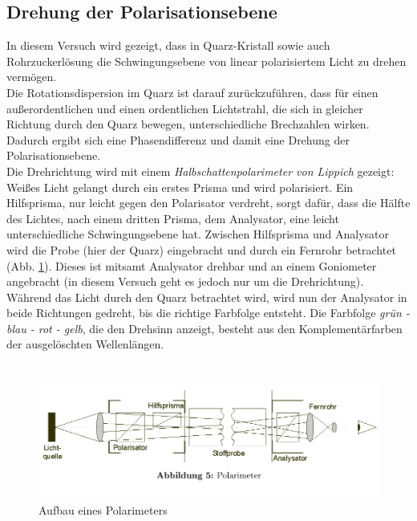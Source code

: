 \documentclass[12pt,a4paper]{article}
\begin{document}
\begin{multicols}{2}
\subsection{Drehung der Polarisationsebene}

In diesem Versuch wird gezeigt, dass in Quarz-Kristall sowie auch Rohrzuckerlösung die Schwingungsebene von linear polarisiertem Licht zu drehen vermögen.\\
Die Rotationsdispersion im Quarz ist darauf zurückzuführen, dass für einen außerordentlichen und einen ordentlichen Lichtstrahl, die sich in gleicher Richtung durch den Quarz bewegen, unterschiedliche Brechzahlen wirken. Dadurch ergibt sich eine Phasendifferenz und damit eine Drehung der Polarisationsebene.\\
Die Drehrichtung wird mit einem \emph{Halbschattenpolarimeter von Lippich} gezeigt: Weißes Licht gelangt durch ein erstes Prisma und wird polarisiert. Ein Hilfsprisma, nur leicht gegen den Polarisator verdreht, sorgt dafür, dass die Hälfte des Lichtes, nach einem dritten Prisma, dem Analysator, eine leicht unterschiedliche Schwingungsebene hat. Zwischen Hilfsprisma und Analysator wird die Probe (hier der Quarz) eingebracht und durch ein Fernrohr betrachtet (Abb. \ref{fig:polarimeter}). Dieses ist mitsamt Analysator drehbar und an einem Goniometer angebracht (in diesem Versuch geht es jedoch nur um die Drehrichtung).\\
Während das Licht durch den Quarz betrachtet wird, wird nun der Analysator in beide Richtungen gedreht, bis die richtige Farbfolge entsteht. Die Farbfolge \emph{grün - blau - rot - gelb}, die den Drehsinn anzeigt, besteht aus den Komplementärfarben der ausgelöschten Wellenlängen.\\
\\
\begin{figure}[H]
	\centering
	\includegraphics[scale=0.5]{./data/rotationsdispersion.png}
	\caption{Aufbau eines Polarimeters}
	\label{fig:polarimeter}
\end{figure}



\end{multicols}
\end{document}
